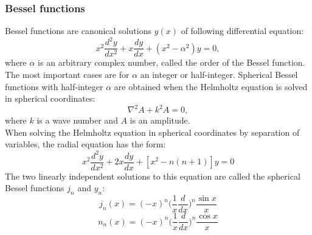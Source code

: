 \documentclass[a4paper, 12pt]{article}
\begin{document}
\subsubsection{Bessel functions}
Bessel functions are canonical solutions $y(x)$ of following differential equation:
\begin{equation}\label{bess_eq}
x^2\frac{d^2 y}{dx^2}+x\frac{dy}{dx}+(x^2-\alpha^2)y = 0,
\end{equation}
where $\alpha$ is an arbitrary complex number, called the order of the Bessel function.\\
The most important cases are for $\alpha$ an integer or half-integer. Spherical Bessel functions with half-integer $\alpha$ are obtained when the Helmholtz equation is solved in spherical coordinates:
$$\nabla^2 A+k^2 A=0,$$
where $k$  is a wave number and $A$ is an amplitude.\\
When solving the Helmholtz equation in spherical coordinates by separation of variables, the radial equation has the form:
$$x^2\frac{d^2 y}{dx^2}+2x\frac{dy}{dx}+[x^2-n(n+1)]y = 0$$
The two linearly independent solutions to this equation are called the spherical Bessel functions $j_n$ and $y_n$:
\begin{equation}\label{bess_func1}
	j_n(x) = (-x)^n\bigg(\frac{1}{x} \frac{d}{dx}\bigg)^n \frac{\sin{x}}{x}
\end{equation}
\begin{equation}\label{bess_func2}
	n_n(x) = (-x)^n\bigg(\frac{1}{x} \frac{d}{dx}\bigg)^n \frac{\cos{x}}{x}
\end{equation}
\end{document}
